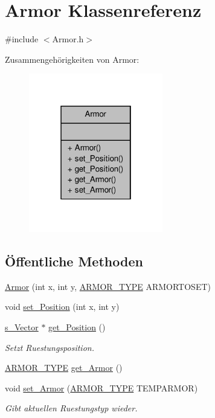 \hypertarget{class_armor}{\section{Armor Klassenreferenz}
\label{class_armor}
}


{\ttfamily \#include $<$Armor.\-h$>$}



Zusammengehörigkeiten von Armor\-:
\nopagebreak
\begin{figure}[H]
\begin{center}
\leavevmode
\includegraphics[width=166pt]{class_armor__coll__graph}
\end{center}
\end{figure}
\subsection*{Öffentliche Methoden}
\begin{DoxyCompactItemize}
\item 
\hyperlink{class_armor_ab9f3edb9b0fe736b82056fbfd6abe467}{Armor} (int x, int y, \hyperlink{globals_8h_a8e5f74edbc14259a161d93bd9a69d236}{A\-R\-M\-O\-R\-\_\-\-T\-Y\-P\-E} A\-R\-M\-O\-R\-T\-O\-S\-E\-T)
\item 
void \hyperlink{class_armor_a007fd5929f7cd4c3ab062094c2465371}{set\-\_\-\-Position} (int x, int y)
\item 
\hyperlink{structs___vector}{s\-\_\-\-Vector} $\ast$ \hyperlink{class_armor_aafd49a78e1d9de2ec03bdef3c5b7f454}{get\-\_\-\-Position} ()
\begin{DoxyCompactList}\small\item\em Setzt Ruestungsposition. \end{DoxyCompactList}\item 
\hyperlink{globals_8h_a8e5f74edbc14259a161d93bd9a69d236}{A\-R\-M\-O\-R\-\_\-\-T\-Y\-P\-E} \hyperlink{class_armor_a77760241405973937918be3377b2a02d}{get\-\_\-\-Armor} ()
\item 
void \hyperlink{class_armor_a8c1238b98e8bc91fb39e0e7ef8a331bf}{set\-\_\-\-Armor} (\hyperlink{globals_8h_a8e5f74edbc14259a161d93bd9a69d236}{A\-R\-M\-O\-R\-\_\-\-T\-Y\-P\-E} T\-E\-M\-P\-A\-R\-M\-O\-R)
\begin{DoxyCompactList}\small\item\em Gibt aktuellen Ruestungstyp wieder. \end{DoxyCompactList}\end{DoxyCompactItemize}



